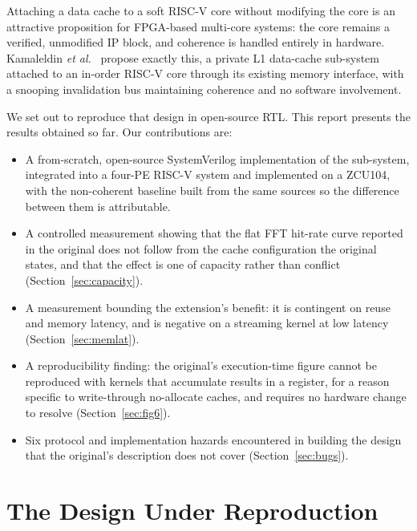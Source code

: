 \documentclass[conference]{IEEEtran}
\begin{document}
Attaching a data cache to a soft RISC-V core without modifying the core is an
attractive proposition for FPGA-based multi-core systems: the core remains a
verified, unmodified IP block, and coherence is handled entirely in hardware.
Kamaleldin \emph{et al.}~\cite{kamaleldin2024} propose exactly this, a private
L1 data-cache sub-system attached to an in-order RISC-V core through its
existing memory interface, with a snooping invalidation bus maintaining
coherence and no software involvement.

We set out to reproduce that design in open-source RTL. This report presents the
results obtained so far. Our contributions are:

\begin{itemize}
  \item A from-scratch, open-source SystemVerilog implementation of the
        sub-system, integrated into a four-PE RISC-V system and implemented on a
        ZCU104, with the non-coherent baseline built from the same sources so
        the difference between them is attributable.
  \item A controlled measurement showing that the flat FFT hit-rate curve
        reported in the original does not follow from the cache configuration
        the original states, and that the effect is one of capacity rather than
        conflict (Section~\ref{sec:capacity}).
  \item A measurement bounding the extension's benefit: it is contingent on
        reuse and memory latency, and is negative on a streaming kernel at low
        latency (Section~\ref{sec:memlat}).
  \item A reproducibility finding: the original's execution-time figure cannot
        be reproduced with kernels that accumulate results in a register, for a
        reason specific to write-through no-allocate caches, and requires no
        hardware change to resolve (Section~\ref{sec:fig6}).
  \item Six protocol and implementation hazards encountered in building the
        design that the original's description does not cover
        (Section~\ref{sec:bugs}).
\end{itemize}

\section{The Design Under Reproduction}
\end{document}
